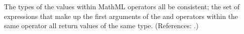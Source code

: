 \removedRule
  {The types of the values within MathML  operators  all
be consistent; \ie the set of expressions that make up the first
arguments of the  and  operators within the
same  operator  all return values of the same type.}
  {(References: .)}
